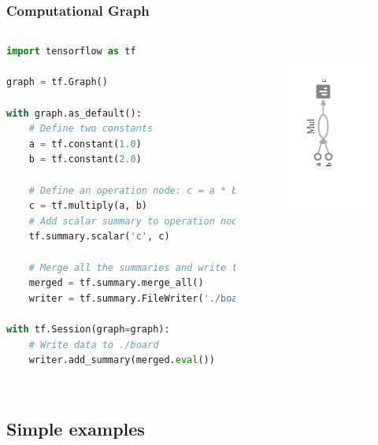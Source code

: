 \begin{frame}[fragile]
  \MyLogo
  \frametitle{Computational Graph}  
%  
\begin{columns}
\tiny{
\begin{lstlisting}[language=python]
import tensorflow as tf

graph = tf.Graph()

with graph.as_default():
	# Define two constants
	a = tf.constant(1.0)
	b = tf.constant(2.0)

	# Define an operation node: c = a * b
	c = tf.multiply(a, b)
	# Add scalar summary to operation node
	tf.summary.scalar('c', c)
	
	# Merge all the summaries and write to ./board
	merged = tf.summary.merge_all()
	writer = tf.summary.FileWriter('./board', graph)

with tf.Session(graph=graph):
	# Write data to ./board
	writer.add_summary(merged.eval())
	
\end{lstlisting}
}
%
\begin{figure}[htbp] 
   \includegraphics[height=2.5in]{figures/compgraph.png} 
\end{figure}
%
\end{columns}
\end{frame}

\subsection{Simple examples}

